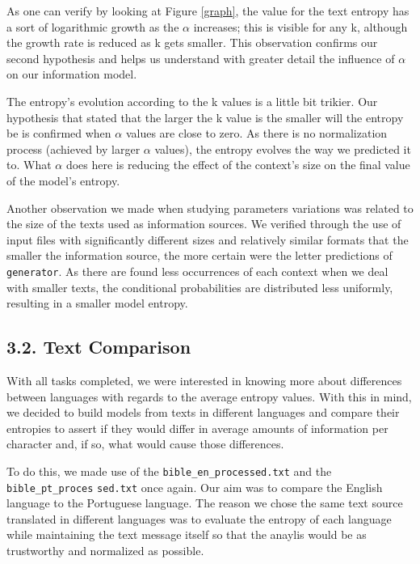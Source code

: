\documentclass[12pt]{article}
\begin{document}
As one can verify by looking at Figure \ref{graph}, the value for the text
entropy has a sort of logarithmic growth as the $\alpha$ increases; this is 
visible for any k, although the growth rate is reduced as k gets smaller.
This observation confirms our second hypothesis and helps us understand with
greater detail the influence of $\alpha$ on our information model.

The entropy's evolution according to the k values is a little bit trikier.
Our hypothesis that stated that the larger the k value is the smaller will
the entropy be is confirmed when $\alpha$ values are close to zero.
As there is no normalization process (achieved by larger $\alpha$ values),
the entropy evolves the way we predicted it to.
What $\alpha$ does here is reducing the effect of the context's size on the 
final value of the model's entropy.

Another observation we made when studying parameters variations was related
to the size of the texts used as information sources.
We verified through the use of input files with significantly different sizes
and relatively similar formats that the smaller the information source, the
more certain were the letter predictions of \texttt{generator}.
As there are found less occurrences of each context when we deal with smaller
texts, the conditional probabilities are distributed less uniformly, resulting
in a smaller model entropy.

\subsection*{3.2. Text Comparison}

With all tasks completed, we were interested in knowing more about differences
between languages with regards to the average entropy values.
With this in mind, we decided to build models from texts in different languages
and compare their entropies to assert if they would differ in average amounts
of information per character and, if so, what would cause those differences. 

To do this, we made use of the \texttt{bible\_en\_processed.txt} and the 
\texttt{bible\_pt\_proces} \texttt{sed.txt} once again.
Our aim was to compare the English language to the Portuguese language. 
The reason we chose the same text source translated in different languages
was to evaluate the entropy of each language while maintaining the text message
itself so that the anaylis would be as trustworthy and normalized as possible.
\end{document}
